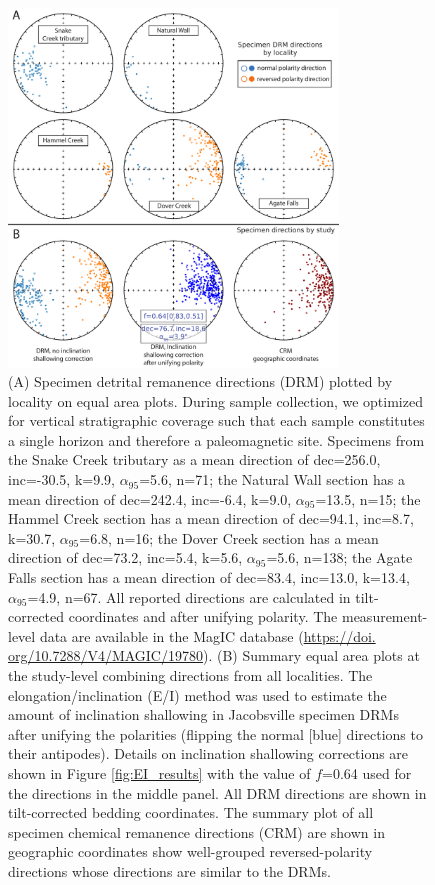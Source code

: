 \begin{figure}[h!]
\centering
\includegraphics[width=0.78\textwidth]{figure/Zhang2024a/in_situ_pmag.pdf}
\caption[Summary figures for paleomagnetic results]{\scriptsize (A) Specimen detrital remanence directions (DRM) plotted by locality on equal area plots. During sample collection, we optimized for vertical stratigraphic coverage such that each sample constitutes a single horizon and therefore a paleomagnetic site. Specimens from the Snake Creek tributary as a mean direction of dec=256.0\textdegree, inc=-30.5\textdegree, k=9.9, $\alpha_{95}$=5.6\textdegree, n=71; the Natural Wall section has a mean direction of dec=242.4\textdegree, inc=-6.4\textdegree, k=9.0, $\alpha_{95}$=13.5\textdegree, n=15; the Hammel Creek section has a mean direction of dec=94.1\textdegree, inc=8.7\textdegree, k=30.7, $\alpha_{95}$=6.8\textdegree, n=16; the Dover Creek section has a mean direction of dec=73.2\textdegree, inc=5.4\textdegree, k=5.6, $\alpha_{95}$=5.6\textdegree, n=138; the Agate Falls section has a mean direction of dec=83.4\textdegree, inc=13.0\textdegree, k=13.4, $\alpha_{95}$=4.9\textdegree, n=67. All reported directions are calculated in tilt-corrected coordinates and after unifying polarity. The measurement-level data are available in the MagIC database (\url{https://doi. org/10.7288/V4/MAGIC/19780}). (B) Summary equal area plots at the study-level combining directions from all localities. The elongation/inclination (E/I) method \citep{Tauxe2004b} was used to estimate the amount of inclination shallowing in Jacobsville specimen DRMs after unifying the polarities (flipping the normal [blue] directions to their antipodes). Details on inclination shallowing corrections are shown in Figure \ref{fig:EI_results} with the value of $f$=0.64 used for the directions in the middle panel. All DRM directions are shown in tilt-corrected bedding coordinates. The summary plot of all specimen chemical remanence directions (CRM) are shown in geographic coordinates show well-grouped reversed-polarity directions whose directions are similar to the DRMs. }
\label{fig:in_situ_pmag}
\end{figure}

